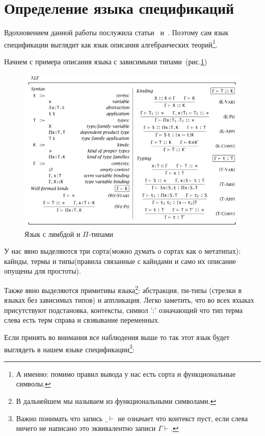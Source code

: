 \section{Определение языка спецификаций}

Вдохновением данной работы послужила статьи~\cite{Palmgren} и~\cite{isaev}. Поэтому сам язык спецификации выглядит как язык описания алгебраических теорий\footnote{А именно: помимо правил вывода у нас есть сорта и функциональные символы.}.

Начнем с примера описания языка с зависимыми типами~(рис.\ref{lpi})~\cite[Глава~2.1]{book:pierce}

\begin{figure}
    \centering
	\includegraphics[scale=0.35]{img/lp.png}
	\caption{Язык с лямбдой и $\Pi$-типами }
	\label{lpi}
\end{figure}

У нас явно выделяются три сорта(можно думать о сортах как о метатипах): кайнды, термы и типы(правила связанные с кайндами и само их описание опущены для простоты).

Также явно выделяются примитивы языка\footnote{В дальнейшем мы называем из функциональными символами.}:
абстракция, пи-типы (стрелки в языках без зависимых типов) и аппликация. Легко заметить, что во всех яхыках присутствуют подстановка, контексты, символ ':' означающий что тип терма слева есть терм справа и свзяывание переменных.

Если принять во внимания все наблюдения выше то так этот язык будет выглядеть в нашем языке спецификации\footnote{Важно понимать что запись $\_ \vdash$ не означает что контекст пуст, если слева ничего не написано это эквивалентно записи $\Gamma \vdash$.}:

